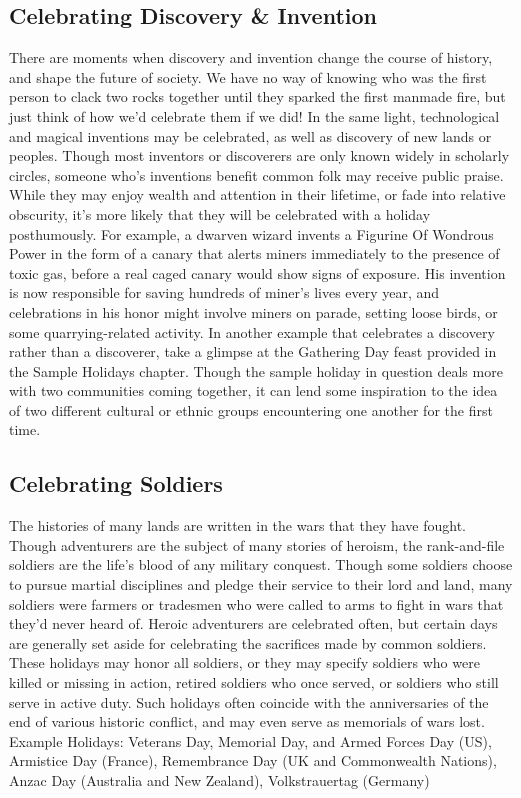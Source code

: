 \documentclass[10pt,a4paper,twoside,bg=print,twocolumn,openany,nodeprecatedcode]{dndbook}
\begin{document}
\subsection{Celebrating Discovery \& Invention}
There are moments when discovery and invention change the course of history, and shape the future of society. We have no way of knowing who was the first person to clack two rocks together until they sparked the first manmade fire, but just think of how we'd celebrate them if we did! In the same light, technological and magical inventions may be celebrated, as well as discovery of new lands or peoples. Though most inventors or discoverers are only known widely in scholarly circles, someone who's inventions benefit common folk may receive public praise. While they may enjoy wealth and attention in their lifetime, or fade into relative obscurity, it's more likely that they will be celebrated with a holiday posthumously.
For example, a dwarven wizard invents a Figurine Of Wondrous Power in the form of a canary that alerts miners immediately to the presence of toxic gas, before a real caged canary would show signs of exposure. His invention is now responsible for saving hundreds of miner's lives every year, and celebrations in his honor might involve miners on parade, setting loose birds, or some quarrying-related activity.
In another example that celebrates a discovery rather than a discoverer, take a glimpse at the Gathering Day feast provided in the Sample Holidays chapter. Though the sample holiday in question deals more with two communities coming together, it can lend some inspiration to the idea of two different cultural or ethnic groups encountering one another for the first time.
\subsection{Celebrating Soldiers}
The histories of many lands are written in the wars that they have fought. Though adventurers are the subject of many stories of heroism, the rank-and-file soldiers are the life's blood of any military conquest. Though some soldiers choose to pursue martial disciplines and pledge their service to their lord and land, many soldiers were farmers or tradesmen who were called to arms to fight in wars that they'd never heard of.
Heroic adventurers are celebrated often, but certain days are generally set aside for celebrating the sacrifices made by common soldiers. These holidays may honor all soldiers, or they may specify soldiers who were killed or missing in action, retired soldiers who once served, or soldiers who still serve in active duty. Such holidays often coincide with the anniversaries of the end of various historic conflict, and may even serve as memorials of wars lost.
Example Holidays: Veterans Day, Memorial Day, and Armed Forces Day (US), Armistice Day (France), Remembrance Day (UK and Commonwealth Nations), Anzac Day (Australia and New Zealand), Volkstrauertag (Germany)
\end{document}
